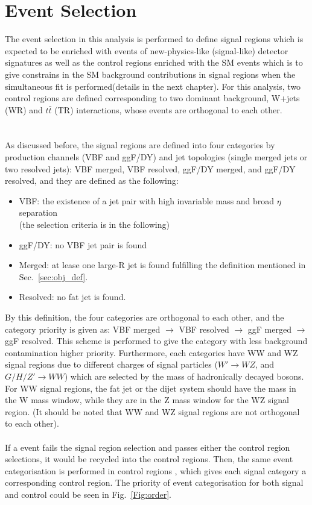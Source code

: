 \section{Event Selection}
The event selection in this analysis is performed to define signal regions which is expected to be enriched with events of new-physics-like (signal-like) detector signatures as well as the control regions enriched with the SM events which is to give constrains in the SM background contributions in signal regions when the simultaneous fit is performed(details in the next chapter). For this analysis, two control regions are defined corresponding to two dominant background, W+jets (WR) and $t\bar{t}$ (TR) interactions, whose events are orthogonal to each other.  
\\
\\
\\As discussed before, the signal regions are defined into four categories by production channels (VBF and ggF/DY) and jet topologies (single merged jets or two resolved jets): VBF merged, VBF resolved, ggF/DY merged, and ggF/DY resolved, and they are defined as the following:
\begin{itemize}
	\item VBF: the existence of a jet pair with high invariable mass and broad $\eta$ separation \\(the selection criteria is in the following) 
	\item ggF/DY: no VBF jet pair is found
	\item Merged: at lease one large-R jet is found fulfilling the definition mentioned in Sec.~\ref{sec:obj_def}.
	\item Resolved: no fat jet is found. 
\end{itemize}
By this definition, the four categories are orthogonal to each other, and the category priority is given as:
VBF merged $\to$ VBF resolved $\to$ ggF merged $\to$ ggF resolved. This scheme is performed to give the category with less background contamination higher priority. Furthermore, each categories have WW and WZ signal regions due to different charges of signal particles ($W'\to WZ$, and $G/H/Z' \to WW$) which are selected by the mass of hadronically decayed bosons. For WW signal regions, the fat jet or the dijet system should have the mass in the W mass window, while they are in the Z mass window for the WZ signal region. (It should be noted that WW and WZ signal regions are not orthogonal to each other).  
\\
\\If a event fails the signal region selection and passes either  the control region selections, it would be recycled into the control regions. Then, the same event categorisation is performed in control regions , which gives each signal category a corresponding control region. The priority of event categorisation for both signal and control could be seen in Fig.~\ref{Fig:order}.
